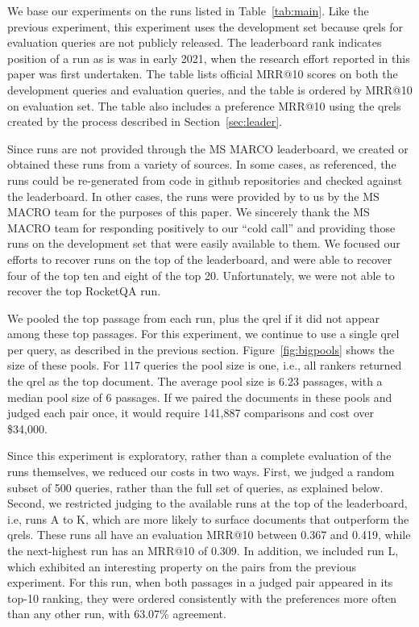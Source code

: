 \documentclass[fullpage]{article}
\begin{document}
We base our experiments on the runs listed in Table~\ref{tab:main}. Like the previous experiment, this experiment uses the development set because qrels for evaluation queries are not publicly released.  The leaderboard rank indicates position of a run as is was in early 2021, when the research effort reported in this paper was first undertaken. The table lists official MRR@10 scores on both the development queries and evaluation queries, and the table is ordered by MRR@10 on evaluation set. The table also includes a preference MRR@10 using the qrels created by the process described in Section~\ref{sec:leader}.

Since runs are not provided through the MS MARCO leaderboard, we created or obtained these runs from a variety of sources. In some cases, as referenced, the runs could be re-generated from code in github repositories and checked against the leaderboard. In other cases, the runs were provided by to us by the MS MACRO team for the purposes of this paper. We sincerely thank the MS MACRO team for responding positively to our ``cold call'' and providing those runs on the development set that were easily available to them. We focused our efforts to recover runs on the top of the leaderboard, and were able to recover four of the top ten and eight of the top 20. Unfortunately, we were not able to recover the top RocketQA run.

We pooled the top passage from each run, plus the qrel if it did not appear among these top passages. For this experiment, we continue to use a single qrel per query, as described in the previous section. Figure~\ref{fig:bigpools} shows the size of these pools. For 117 queries the pool size is one, i.e., all rankers returned the qrel as the top document. The average pool size is 6.23 passages, with a median pool size of 6 passages. If we paired the documents in these pools and judged each pair once, it would require 141,887 comparisons and cost over \$34,000.

Since this experiment is exploratory, rather than a complete evaluation of the runs themselves, we reduced our costs in two ways. First, we judged a random subset of 500 queries, rather than the full set of queries, as explained below. Second, we restricted judging to the available runs at the top of the leaderboard, i.e, runs A to K, which are more likely to surface documents that outperform the qrels. These runs all have an evaluation MRR@10 between 0.367 and 0.419, while the next-highest run has an MRR@10 of 0.309. In addition, we included run L, which exhibited an interesting property on the pairs from the previous experiment. For this run, when both passages in a judged pair appeared in its top-10 ranking, they were ordered consistently with the preferences more often than any other run, with 63.07\% agreement.
\end{document}
